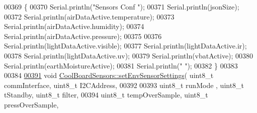 \begin{DoxyCode}
00369 \{
00370     Serial.println(\textcolor{stringliteral}{"Sensors Conf "});
00371     Serial.println(jsonSize);
00372     Serial.println(airDataActive.temperature);
00373     Serial.println(airDataActive.humidity);
00374     Serial.println(airDataActive.pressure);
00375 
00376     Serial.println(lightDataActive.visible);
00377     Serial.println(lightDataActive.ir);
00378     Serial.println(lightDataActive.uv);
00379     Serial.println(vbatActive);
00380     Serial.println(earthMoistureActive);
00381     Serial.println(\textcolor{stringliteral}{" "});
00382 \}
00383 
00384 
\hyperlink{class_cool_board_sensors_a406307ffd70272282d91479c7ed8d66f}{00391} \textcolor{keywordtype}{void} \hyperlink{class_cool_board_sensors_a406307ffd70272282d91479c7ed8d66f}{CoolBoardSensors::setEnvSensorSettings}( uint8\_t commInterface, 
      uint8\_t I2CAddress,    
00392 
00393                            uint8\_t runMode , uint8\_t tStandby, uint8\_t filter,                         
00394                            uint8\_t tempOverSample,  uint8\_t pressOverSample,                                
         

\end{DoxyCode}

